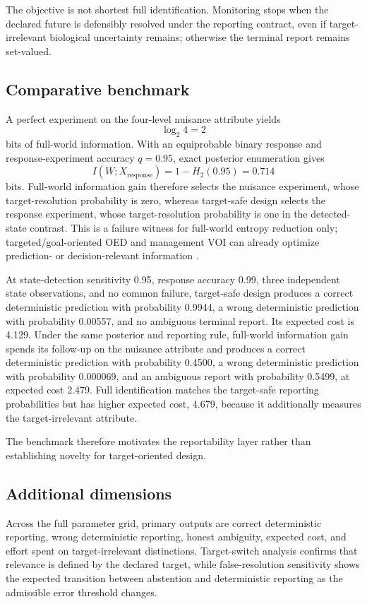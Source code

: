 \documentclass[11pt]{article}
\begin{document}
The objective is not shortest full identification. Monitoring stops when the declared future is defensibly resolved under the reporting contract, even if target-irrelevant biological uncertainty remains; otherwise the terminal report remains set-valued.

\subsection{Comparative benchmark}
A perfect experiment on the four-level nuisance attribute yields
\[
\log_2 4=2
\]
bits of full-world information. With an equiprobable binary response and response-experiment accuracy $q=0.95$, exact posterior enumeration gives
\[
I(W;X_{\mathrm{response}})=1-H_2(0.95)=0.714
\]
bits. Full-world information gain therefore selects the nuisance experiment, whose target-resolution probability is zero, whereas target-safe design selects the response experiment, whose target-resolution probability is one in the detected-state contrast. This is a failure witness for full-world entropy reduction only; targeted/goal-oriented OED and management VOI can already optimize prediction- or decision-relevant information \cite{VanlierEtAl2012,AttiaEtAl2018,ZhongEtAl2026,CanessaEtAl2015}.

At state-detection sensitivity 0.95, response accuracy 0.99, three independent state observations, and no common failure, target-safe design produces a correct deterministic prediction with probability 0.9944, a wrong deterministic prediction with probability 0.00557, and no ambiguous terminal report. Its expected cost is 4.129. Under the same posterior and reporting rule, full-world information gain spends its follow-up on the nuisance attribute and produces a correct deterministic prediction with probability 0.4500, a wrong deterministic prediction with probability 0.000069, and an ambiguous report with probability 0.5499, at expected cost 2.479. Full identification matches the target-safe reporting probabilities but has higher expected cost, 4.679, because it additionally measures the target-irrelevant attribute.

The benchmark therefore motivates the reportability layer rather than establishing novelty for target-oriented design.

\subsection{Additional dimensions}
Across the full parameter grid, primary outputs are correct deterministic reporting, wrong deterministic reporting, honest ambiguity, expected cost, and effort spent on target-irrelevant distinctions. Target-switch analysis confirms that relevance is defined by the declared target, while false-resolution sensitivity shows the expected transition between abstention and deterministic reporting as the admissible error threshold changes.
\end{document}
